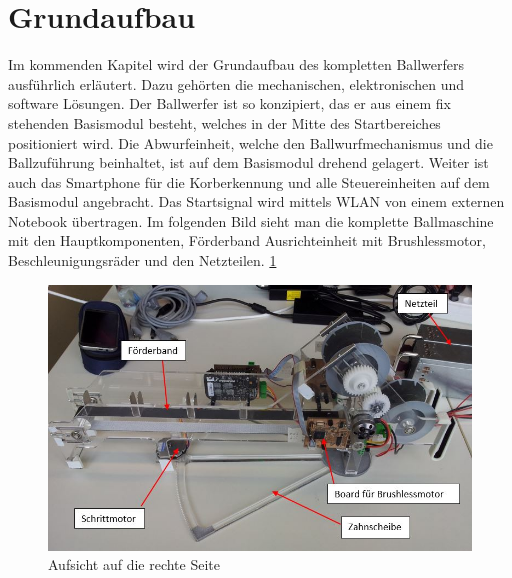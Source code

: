 \section{Grundaufbau}
	Im kommenden Kapitel wird der Grundaufbau des kompletten Ballwerfers ausführlich erläutert. 
	Dazu gehörten die mechanischen, elektronischen und software Lösungen. 
    Der Ballwerfer ist so konzipiert, das er aus einem fix stehenden Basismodul besteht, 
    welches in der Mitte des Startbereiches positioniert wird. Die Abwurfeinheit, welche 
    den Ballwurfmechanismus und die Ballzuführung beinhaltet, ist auf dem Basismodul 
    drehend gelagert. Weiter ist auch das Smartphone für die Korberkennung und alle 
    Steuereinheiten auf dem Basismodul angebracht. Das Startsignal wird mittels WLAN 
    von einem externen Notebook übertragen. Im folgenden Bild sieht man die komplette Ballmaschine mit den Hauptkomponenten, Förderband
    Ausrichteinheit mit Brushlessmotor, Beschleunigungsräder und den Netzteilen. \ref{abb:Ballmaschine} \\
    \begin{figure}[h!]
    	\includegraphics[width=.93\textwidth,clip,trim=0mm 0mm 0mm 0mm]
    	{Enddokumentation/Bilder/Geraeteuebersicht_2.jpg}
    	\centering
    	\caption{Aufsicht auf die rechte Seite}
    	\label{abb:Ballmaschine}
    \end{figure}
    
